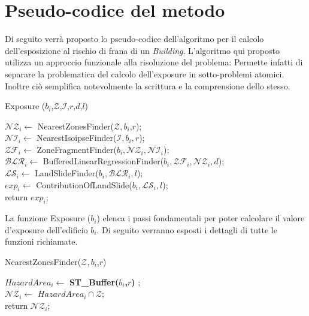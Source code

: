 
\chapter{Pseudo-codice del metodo} %

\label{ch:name} %
Di seguito verrà proposto lo pseudo-codice dell'algoritmo per il calcolo dell'esposizione al rischio di frana di un \textit{Building}. L'algoritmo qui proposto utilizza un approccio funzionale alla risoluzione del problema: Permette infatti di separare la problematica del calcolo dell'exposure in sotto-problemi atomici. Inoltre ciò semplifica notevolmente la scrittura e la comprensione dello stesso.



\begin{algorithm}[H]	
	
	\IncMargin{1em}
	\caption{Exposure ($b_i$,$\mathcal{Z}$,$\mathcal{I}$,$r$,$d$,$l$)}
	\label{alg:0}
	\BlankLine
	
	\SetAlgoNoLine
	$ \mathcal{NZ}_i \leftarrow$ NearestZonesFinder($\mathcal{Z},b_i$,$r$); \\
	$ \mathcal{NI}_i \leftarrow$ NearestIsoipseFinder($\mathcal{I},b_i,r$); \\
	$ \mathcal{ZF}_i \leftarrow$ ZoneFragmentFinder($b_i , \mathcal{NZ}_i, \mathcal{NI}_i $);  \\
	$ \mathcal{BLR}_i \leftarrow $ BufferedLinearRegressionFinder($b_i,\mathcal{ZF}_i,\mathcal{NZ}_i,d$); \\
	$ \mathcal{LS}_i \leftarrow $ LandSlideFinder($b_i , \mathcal{BLR}_i, l$); \\
	$ exp_i \leftarrow$ ContributionOfLandSlide($b_i, \mathcal{LS}_i, l$);\\
	return $ exp_i $;
	
	
\end{algorithm}
La funzione Exposure ($b_i$) elenca i passi fondamentali per poter calcolare il  valore d'exposure dell'edificio $b_i$. Di seguito verranno esposti i dettagli di tutte le funzioni richiamate.

\begin{algorithm}[H]
	
	\IncMargin{1em}
	\caption{NearestZonesFinder($\mathcal{Z},b_i$,$r$)}
	\label{alg:1}
	\BlankLine
	\SetAlgoNoLine
	$ HazardArea_i  \leftarrow $ \textbf{ST\_Buffer($b_i$,$r$)} ; \\ 
	$ \mathcal{NZ}_i  \leftarrow $ $HazardArea_i \cap \mathcal{Z}$; \\
	return $\mathcal{NZ}_i$;
	
\end{algorithm}


